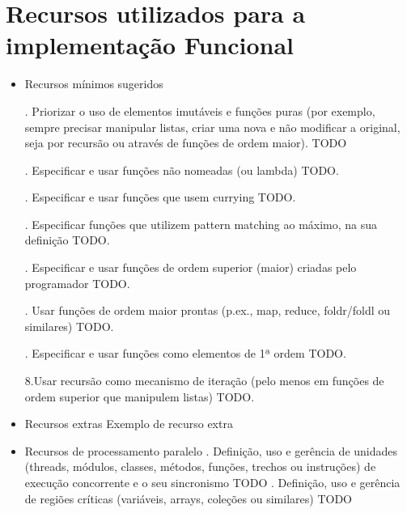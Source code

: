 \documentclass[rel_mlp]{iiufrgs}
\begin{document}
\section{Recursos utilizados para a implementação Funcional}
\begin{itemize}
	\item Recursos mínimos sugeridos
	
	. Priorizar o uso de elementos imutáveis e funções puras (por exemplo, sempre precisar manipular listas, criar uma nova e não modificar a original, seja por recursão ou através de funções de ordem maior). TODO
	
	. Especificar e usar funções não nomeadas (ou lambda) TODO.
	
	. Especificar e usar funções que usem currying TODO.
	
	. Especificar funções que utilizem pattern matching ao máximo, na sua definição TODO.
	
	. Especificar e usar funções de ordem superior (maior) criadas pelo programador TODO.
	
	. Usar funções de ordem maior prontas (p.ex., map, reduce, foldr/foldl ou similares) TODO.
	
	. Especificar e usar funções como elementos de 1ª ordem TODO.
	
	\subitem 8.Usar recursão como mecanismo de iteração (pelo menos em funções de ordem superior que manipulem listas) TODO.
	
	\item Recursos extras
	\subitem Exemplo de recurso extra
	
	\item Recursos de processamento paralelo
		. Definição, uso e gerência de unidades (threads, módulos, classes, métodos, funções, trechos ou instruções) de execução concorrente e o seu sincronismo TODO
		. Definição, uso e gerência de regiões críticas (variáveis, arrays, coleções ou similares) TODO
	
\end{itemize}
\end{document}
